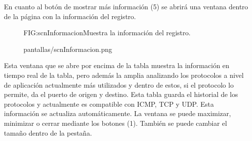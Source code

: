 En cuanto al botón de mostrar más información (5) se abrirá una ventana dentro de la página con la información del registro.

\begin{figure}[Información del registro]{FIG:scnInformacion}{Muestra la información del registro.}
  \begin{image}{}{}{pantallas/scnInformacion.png}
  \end{image}
\end{figure}

\break
Esta ventana que se abre por encima de la tabla muestra la información en tiempo real de la tabla, pero además la amplia analizando los protocolos a nivel de aplicación actualmente más utilizados y dentro de estos, si el protocolo lo permite, da el puerto de origen y destino. Esta tabla guarda el historial de los protocolos y actualmente es compatible con ICMP, TCP y UDP. Esta información se actualiza automáticamente. La ventana se puede maximizar, minimizar o cerrar mediante los botones (1). También se puede cambiar el tamaño dentro de la pestaña.